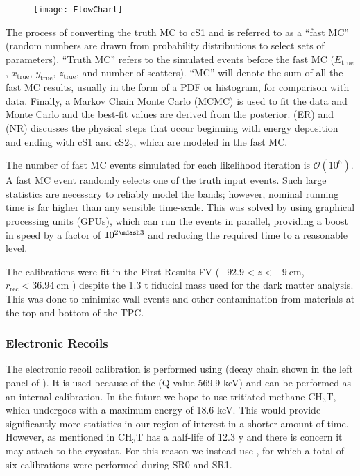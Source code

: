 \begin{figure}
\centering
\texttt{[image: FlowChart]}
\label{fig:er_nr_calibrations_parameter_determ_flow_chart}
\end{figure}

The process of converting the truth MC to cS1 and \cstwob is referred to as a ``fast MC'' (random numbers are drawn from probability
distributions to select sets of parameters).  ``Truth MC'' refers to the simulated events before the fast MC ($E_{\mathrm{true}}$,
$x_{\mathrm{true}}$, $y_{\mathrm{true}}$, $z_{\mathrm{true}}$, and number
of scatters).  ``MC'' will denote the sum of all the fast MC results, usually in the form of a PDF or histogram, for
comparison with data.  Finally, a Markov Chain Monte Carlo (MCMC) is used to fit the data and Monte Carlo and the best-fit values
are derived from the posterior.   (ER) and
 (NR) discusses the physical steps that occur beginning with energy
deposition and ending with cS1 and $\mathrm{cS2_b}$, which are modeled in the fast MC.

The number of fast MC events simulated for each likelihood iteration is $\mathcal{O}(10^6)$.  A fast MC event randomly selects one of the
truth input events.  Such large statistics are necessary to reliably model the bands;
however, nominal running time is far higher than any sensible time-scale.  This was solved by using graphical processing units (GPUs),
which can run the events in parallel, providing a boost in speed by a factor of $10^{2 \mdash 3}$ and reducing the required time to a
reasonable level.

The calibrations were fit in the First Results FV ($-92.9 < z < -9\ \mathrm{cm}$, $r_{\mathrm{rec}} < 36.94\ \mathrm{cm}$
) despite the 1.3 t fiducial mass used for the dark matter analysis.  This was done to
minimize wall events and other contamination from materials at the top and bottom of the TPC.



\subsubsection{Electronic Recoils}
\label{subsubsec:er_nr_calibrations_parameter_determ_er}
The electronic recoil calibration is performed using  (decay chain shown in the left panel of
).  It is used because of the  \betadecay (Q-value 569.9 keV) and can
be performed as an internal calibration.  In the future we hope to use tritiated methane $\mathrm{C H_3 T}$, which undergoes \betadecay
with a maximum energy of 18.6 keV.  This would provide significantly more statistics in our region of interest in a shorter amount
of time.  However, as mentioned in  $\mathrm{C H_3 T}$ has a half-life of 12.3 y and there
is concern it may attach to the cryostat.  For this reason we instead use , for which a total of six calibrations were
performed during SR0 and SR1.

